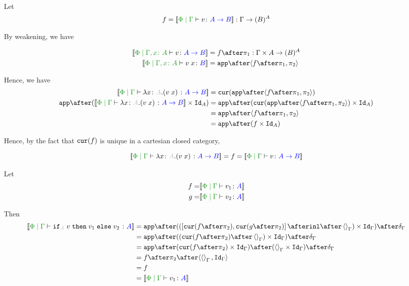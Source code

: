 \documentclass{report}
\begin{document}

Let 
\begin{equation}
    f = \deno{\gpetyperelation{v}{\ab}} : \G \rightarrow (B)^{A}
\end{equation}

By weakening, we have

\begin{align*}
    \deno{\etyperelation{\P}{\gax}{v}{\ab}} & = f \after \p : \G \times A \rightarrow (B)^A \\
    \deno{\etyperelation{\P}{\gax}{\apply{v}{x}}{B}} & = \app\after\pr{f \after \p}{\pp} \\
\end{align*}

Hence, we have 
\begin{equation}
    \begin{split}
        \deno{\gpetyperelation{\lam{x}{A}{(\apply{v}{x})}}{\ab}} & = \cur{\app\after\pr{f \after \p}{\pp}}\\
        \app\after(\deno{\gpetyperelation{\lam{x}{A}{(\apply{v}{x})}}{\ab}} \times \Id{A}) & = \app \after(\cur{\app\after\pr{f \after \p}{\pp}}\times \Id{A})\\
        & = \app \after\pr{f\after\p}{\pp}\\
        & = \app\after(f\times\Id{A})
    \end{split}
\end{equation}

Hence, by the fact that $\texttt{cur}(f)$ is unique in a cartesian closed category, 

\begin{equation}
    \deno{\gpetyperelation{\lam{x}{A}{(\apply{v}{x})}}{\ab}} = f =\deno{\gpetyperelation{v}{\ab}}
\end{equation}

Let
\begin{align*}
    f = &\deno{\gpetyperelation{v_1}{A}}\\
    g = &\deno{\gpetyperelation{v_2}{A}}\\
\end{align*}

Then
\begin{equation}
    \begin{split}
        \deno{\gpetyperelation{\pifthenelse{A}{v}{v_1}{v_2}}{A}} & = \ifMorph{\inl\after\term{\G}}{f}{g} \\
        & = \app\after((\cur{f\after\pp}\after\term{\G})\times\idg)\after\diag{\G}\\
        & = \app\after(\cur{f\after\pp}\times\idg)\after(\term{\G}\times\idg)\after\diag{\G}\\
        & = f\after\pp\after\pr{\term{\G}}{\idg}\\
        & = f \\
        & = \deno{\gpetyperelation{v_1}{A}}\\
    \end{split}
\end{equation}
\end{document}
